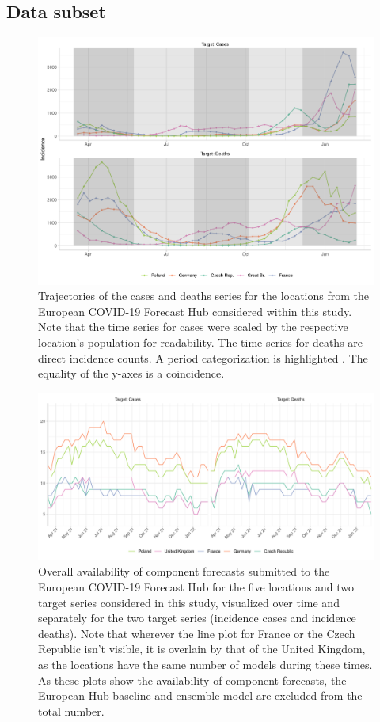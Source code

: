 \subsection{Data subset} \label{sub:hub_data}
\begin{figure}
\includegraphics[width = \textwidth]{../plots/trajectories.pdf}
\caption{Trajectories of the cases and deaths series for the locations from the European COVID-19 Forecast Hub considered within this study. Note that the time series for cases were scaled by the respective location's population for readability. The time series for deaths are direct incidence counts.  A period categorization is highlighted . The equality of the y-axes is a coincidence.}
\label{fig:trajectories}
\end{figure}
\begin{figure}
\includegraphics[width = \textwidth]{../plots/availability_overall.pdf}
\caption{Overall availability of component forecasts submitted to the European COVID-19 Forecast Hub for the five locations and two target series considered in this study, visualized over time and separately for the two target series (incidence cases and incidence deaths). Note that wherever the line plot for France or the Czech Republic isn't visible, it is overlain by that of the United Kingdom, as the locations have the same number of models during these times. As these plots show the availability of component forecasts, the European Hub baseline and ensemble model are excluded from the total number.}
\label{fig:avail_ovrl}
\end{figure}
